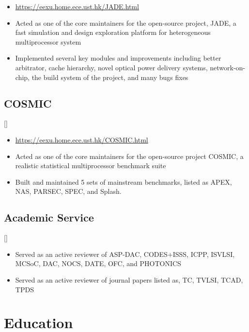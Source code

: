 \documentclass{mycv}
\begin{document}
\begin{itemize}
  \item \url{https://eexu.home.ece.ust.hk/JADE.html}
  \item Acted as one of the core maintainers for the open-source project, JADE, a fast simulation and design exploration platform for heterogeneous multiprocessor system
  \item Implemented several key modules and improvements including better arbitrator, cache hierarchy, novel optical power delivery systems, network-on-chip, the build system of the project, and many bugs fixes
\end{itemize}

\subsection{COSMIC}[]
\begin{positions}
\end{positions}

\begin{itemize}
	\item \url{https://eexu.home.ece.ust.hk/COSMIC.html}
	\item Acted as one of the core maintainers for the open-source project COSMIC, a realistic statistical multiprocessor benchmark suite
	\item Built and maintained 5 sets of mainstream benchmarks, listed as APEX, NAS, PARSEC, SPEC, and Splash.
\end{itemize}

\subsection{Academic Service}[]
\begin{positions}
\end{positions}

\begin{itemize}
	\item Served as an active reviewer of ASP-DAC, CODES+ISSS, ICPP, ISVLSI, MCSoC, DAC, NOCS, DATE, OFC, and PHOTONICS
	\item Served as an active reviewer of journal papers listed as, TC, TVLSI, TCAD, TPDS
\end{itemize}

\section{Education}
\end{document}
